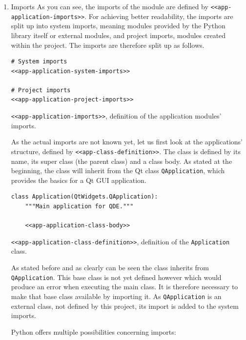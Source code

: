 \documentclass[10pt, openright, notitlepage]{scrreprt}
\begin{document}
\begin{enumerate}
\item Imports
\label{sec:org3721374}
As you can see, the imports of the module are defined by \texttt{<<app-application-imports>>}. For
achieving better readability, the imports are split up into system imports,
meaning modules provided by the Python library itself or external modules, and
project imports, modules created within the project. The imports are therefore
split up as follows.

\begin{listing}[H]
\begin{verbatim}
# System imports
<<app-application-system-imports>>

# Project imports
<<app-application-project-imports>>
\end{verbatim}
\caption{\label{app-application-imports}
\texttt{<<app-application-imports>>}, definition of the application modules' imports.}
\end{listing}

As the actual imports are not known yet, let us first look at the applications'
structure, defined by \texttt{<<app-class-definition>>}. The class is defined by its
name, its super class (the parent class) and a class body. As stated at the
beginning, the class will inherit from the Qt class \texttt{QApplication}, which
provides the basics for a Qt GUI application.

\begin{listing}[H]
\begin{verbatim}
class Application(QtWidgets.QApplication):
    """Main application for QDE."""

    <<app-application-class-body>>
\end{verbatim}
\caption{\label{app-application-class-definition}
\texttt{<<app-application-class-definition>>}, definition of the \texttt{Application} class.}
\end{listing}

As stated before and as clearly can be seen the class inherits from
\texttt{QApplication}. This base class is not yet defined however which would produce
an error when executing the main class. It is therefore necessary to make that
base class available by importing it. As \texttt{QApplication} is an external class,
not defined by this project, its import is added to the system imports.

Python offers multiple possibilities concerning imports:


\end{enumerate}
\end{document}
